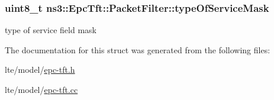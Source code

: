 \subsubsection[{\texorpdfstring{type\+Of\+Service\+Mask}{typeOfServiceMask}}]{\setlength{\rightskip}{0pt plus 5cm}uint8\+\_\+t ns3\+::\+Epc\+Tft\+::\+Packet\+Filter\+::type\+Of\+Service\+Mask}\hypertarget{structns3_1_1EpcTft_1_1PacketFilter_ad97ae3369224f9b909765a6fc473f3e2}{}\label{structns3_1_1EpcTft_1_1PacketFilter_ad97ae3369224f9b909765a6fc473f3e2}
type of service field mask 

The documentation for this struct was generated from the following files\+:\begin{DoxyCompactItemize}
\item 
lte/model/\hyperlink{epc-tft_8h}{epc-\/tft.\+h}\item 
lte/model/\hyperlink{epc-tft_8cc}{epc-\/tft.\+cc}\end{DoxyCompactItemize}
